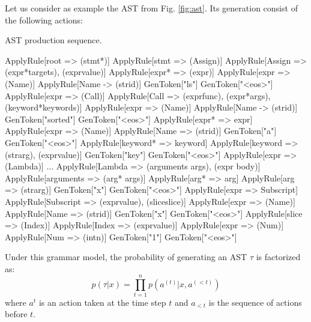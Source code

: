 Let us consider as example the AST from Fig. \ref{fig:ast}. Its generation consist of the following actions:

\begin{codelist}{AST production sequence.}
\begin{verbnobox}[\verbarg]
ApplyRule[root => (stmt*)]
    ApplyRule[stmt => (Assign)]
        ApplyRule[Assign => (expr*{targets}), (expr{value})]
            ApplyRule[expr* => (expr)]
                ApplyRule[expr => (Name)]
                    ApplyRule[Name -> (str{id})]
                        GenToken["ls"]
                        GenToken["<eos>"]
            ApplyRule[expr => (Call)]
                ApplyRule[Call => (expr{func}), (expr*{args}), (keyword*{keywords})]
                    ApplyRule[expr => (Name)]
                        ApplyRule[Name -> (str{id})]
                            GenToken["sorted"]
                            GenToken["<eos>"]
                    ApplyRule[expr* => expr]
                        ApplyRule[expr => (Name)]
                            ApplyRule[Name => (str{id})]
                                GenToken["a"]
                                GenToken["<eos>"]
                    ApplyRule[keyword* => keyword]
                        ApplyRule[keyword => (str{arg}), (expr{value})]
                            GenToken["key"]
                            GenToken["<eos>"]
                            ApplyRule[expr => (Lambda)]
...
ApplyRule[Lambda => (arguments args), (expr body)]
    ApplyRule[arguments => (arg* args)]
        ApplyRule[arg* => arg]
            ApplyRule[arg => (str{arg})]
                GenToken["x"]
                GenToken["<eos>"]
    ApplyRule[expr => Subscript]
        ApplyRule[Subscript => (expr{value}), (slice{slice})]
            ApplyRule[expr => (Name)]
                ApplyRule[Name => (str{id})]
                    GenToken["x"]
                    GenToken["<eos>"]
            ApplyRule[slice => (Index)]
                ApplyRule[Index => (expr{value})]
                    ApplyRule[expr => (Num)]
                        ApplyRule[Num => (int{n})]
                            GenToken["1"]
                            GenToken["<eos>"]
\end{verbnobox}
\label{code:ast_production}
\end{codelist}

Under this grammar model, the probability of generating an AST $\tau$ is factorized as:
\begin{equation}
p(\tau|x) = \prod^{n}_{t=1} p(a^{(t)}|x, a^{(<t)})
\label{eqn:tree_probability}
\end{equation}
where $a^{t}$ is an action taken at the time step $t$ and $a_{<t}$ is the sequence of actions before $t$. 

